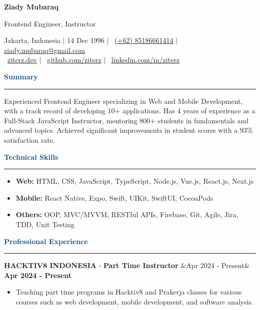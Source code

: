 \documentclass{article}
\newcommand{\header}[1]{
	\vspace{2mm}
	{\large \noindent \textcolor[HTML]{004780}{\textbf{#1}}}
	\vspace{0.5mm}
	\hrule
	\vspace{1.5mm}
}
\newcommand{\skillsheader}[1]{
	\vspace{2mm}
	{\large \noindent \textcolor[HTML]{004780}{\textbf{#1}}}
	\vspace{1.5mm}
	\hrule
	\vspace{1.5mm}
}
\newcommand{\longitem}[4]{
	\begin{adjustwidth}{}{}
		\MakeUppercase{\textbf{#1}} - \textbf{#3} \hfill \ifx&#2& \else \textbf{#2} \fi \\
	\end{adjustwidth}
	\vspace{-1mm}
}
\newcommand{\skills}[1]{%
	\begin{itemize}[leftmargin=*]\leftskip=0.5em
		\setlength\itemsep{-1mm}
		#1
	\end{itemize}%
}
\newcommand{\liststart}{\begin{itemize}[leftmargin=*]\leftskip=0.5em\vspace{-5mm}}
\newcommand{\listend}{\end{itemize}\vspace{0.2mm}}
\begin{document}
	\begin{flushleft}
		{\LARGE \textbf{Ziady Mubaraq}} \\

		\vspace{1mm}

		{\large Frontend Engineer, Instructor}

		\vspace{1mm}
		
		Jakarta, Indonesia  $\mid$ 14 Dec 1996 $\mid$ \faWhatsapp ~\href{https://wa.me/6285186661414}{\underline{(+62) 85186661414}} $\mid$ \faEnvelope[regular] \href{mailto:ziady.mubaraq@gmail.com}{\underline{ziady.mubaraq@gmail.com}} \\
		\faLink ~\href{https://ziterz.dev}{\underline{ziterz.dev}}  $\mid$ \faGithub ~\href{https://github.com/ziterz}{\underline{github.com/ziterz}} $\mid$ \faLinkedin ~\href{https://linkedin.com/in/ziterz}{\underline{linkedin.com/in/ziterz}}
	\end{flushleft}

	\vspace{-1mm}

	\header{Summary}
		Experienced Frontend Engineer specializing in Web and Mobile Development, with a track record of developing 10+ applications. Has 4 years of experience as a Full-Stack JavaScript Instructor, mentoring 800+ students in fundamentals and advanced topics. Achieved significant improvements in student scores with a 93\% satisfaction rate.

	\vspace{1mm}

	\skillsheader{Technical Skills}
	\skills{
		\item \textbf{Web:} HTML, CSS, JavaScript, TypeScript, Node.js, Vue.js, React.js, Next.js
		\item \textbf{Mobile:} React Native, Expo, Swift, UIKit, SwiftUI, CocoaPods
		\item \textbf{Others:} OOP, MVC/MVVM, RESTful APIs, Firebase, Git, Agile, Jira, TDD, Unit Testing
	}		

	\header{Professional Experience}
		\longitem{Hacktiv8 Indonesia}{Apr 2024 - Present}{Part Time Instructor}{}
		\liststart
			\item Teaching part time programs in Hacktiv8 and Prakerja classes for various courses such as web development, mobile development, and software analysis.
		\listend
\end{document}
